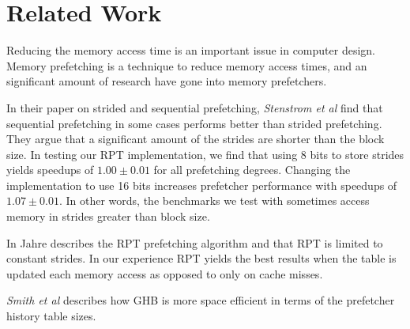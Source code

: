 \section{Related Work}
\label{sec:related-work}

Reducing the memory access time is an important issue in computer
design.  Memory prefetching is a technique to reduce memory access
times, and an significant amount of research have gone into memory
prefetchers.

In their paper on strided and sequential prefetching, \textit{Stenstrom
et al} \cite{bib:stride} find that sequential prefetching in some
cases performs better than strided prefetching. They argue that a
significant amount of the strides are shorter than the block size. In
testing our RPT implementation, we find that using 8 bits to store
strides yields speedups of $1.00\pm0.01$ for all prefetching
degrees. Changing the implementation to use 16 bits increases
prefetcher performance with speedups of $1.07\pm0.01$. In other words,
the benchmarks we test with sometimes access memory in strides greater
than block size.

In \cite{bib:jahre} Jahre describes the RPT prefetching algorithm and that RPT
is limited to constant strides.  In our experience RPT yields the best results
when the table is updated each memory access as opposed to only on cache
misses.

\textit{Smith et al} \cite{bib:ghb} describes how GHB is more space efficient
in terms of the prefetcher history table sizes.



